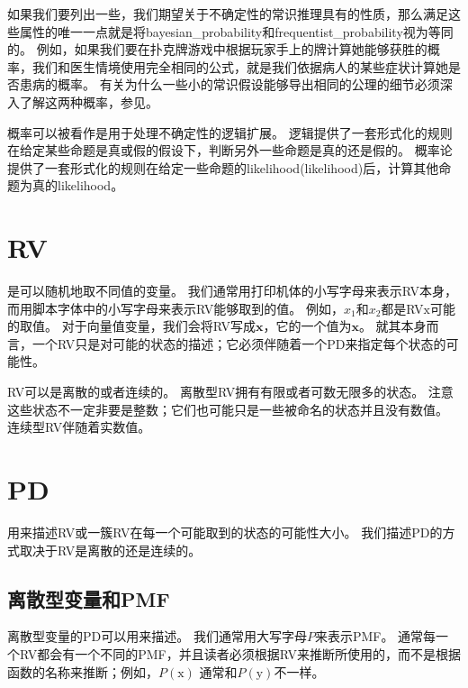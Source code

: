 如果我们要列出一些，我们期望关于不确定性的常识推理具有的性质，那么满足这些属性的唯一一点就是将\gls{bayesian_probability}和\gls{frequentist_probability}视为等同的。
例如，如果我们要在扑克牌游戏中根据玩家手上的牌计算她能够获胜的概率，我们和医生情境使用完全相同的公式，就是我们依据病人的某些症状计算她是否患病的概率。
有关为什么一些小的常识假设能够导出相同的公理的细节必须深入了解这两种概率，参见\cite{Ramsey1926}。


概率可以被看作是用于处理不确定性的逻辑扩展。
逻辑提供了一套形式化的规则在给定某些命题是真或假的假设下，判断另外一些命题是真的还是假的。
概率论提供了一套形式化的规则在给定一些命题的\gls{likelihood}(likelihood)后，计算其他命题为真的\gls{likelihood}。

\section{\gls{RV}}
\label{sec:random_variables}

是可以随机地取不同值的变量。
我们通常用打印机体的小写字母来表示\gls{RV}本身，而用脚本字体中的小写字母来表示\gls{RV}能够取到的值。
例如，$x_1$和$x_2$都是\gls{RV}$\mathrm{x}$可能的取值。
对于向量值变量，我们会将\gls{RV}写成$\mathbf{x}$，它的一个值为$\bm{x}$。
就其本身而言，一个\gls{RV}只是对可能的状态的描述；它必须伴随着一个\gls{PD}来指定每个状态的可能性。

\gls{RV}可以是离散的或者连续的。
离散型\gls{RV}拥有有限或者可数无限多的状态。
注意这些状态不一定非要是整数；它们也可能只是一些被命名的状态并且没有数值。
连续型\gls{RV}伴随着实数值。

\section{\gls{PD}}
\label{sec:probability_distributions}

用来描述\gls{RV}或一簇\gls{RV}在每一个可能取到的状态的可能性大小。
我们描述\gls{PD}的方式取决于\gls{RV}是离散的还是连续的。

\subsection{离散型变量和\gls{PMF}}
\label{sec:discrete_variables_and_probability_mass_functions}

离散型变量的\gls{PD}可以用来描述。
我们通常用大写字母$P$来表示\gls{PMF}。
通常每一个\gls{RV}都会有一个不同的\gls{PMF}，并且读者必须根据\gls{RV}来推断所使用的，而不是根据函数的名称来推断；例如，$P(\mathrm{x})$ 通常和$P(\mathrm{y})$不一样。

